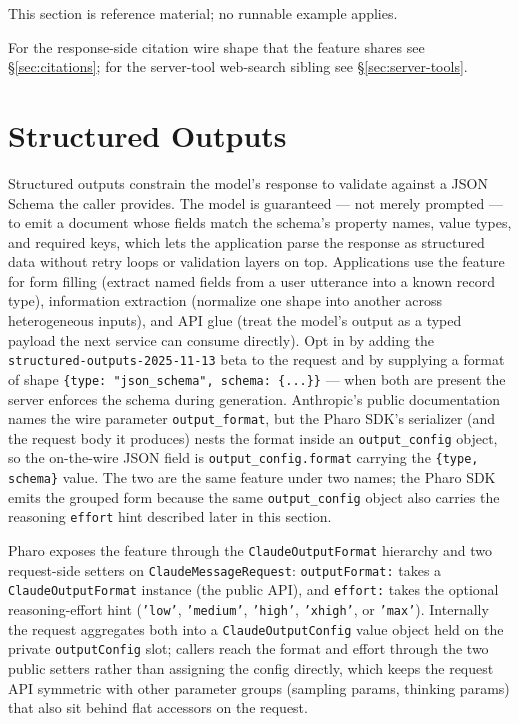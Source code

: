 \documentclass[a4paper,10pt,fleqn]{article}
\begin{document}
This section is reference material; no runnable example applies.

For the response-side citation wire shape that the feature shares
see §\ref{sec:citations}; for the server-tool web-search sibling
see §\ref{sec:server-tools}.

\medskip
\begin{sloppypar}
\end{sloppypar}

\section{Structured Outputs}
\label{sec:structured-outputs}

Structured outputs constrain the model's response to validate
against a JSON Schema the caller provides.  The model is guaranteed
--- not merely prompted --- to emit a document whose fields match
the schema's property names, value types, and required keys, which
lets the application parse the response as structured data without
retry loops or validation layers on top.  Applications use the
feature for form filling (extract named fields from a user
utterance into a known record type), information extraction
(normalize one shape into another across heterogeneous inputs),
and API glue (treat the model's output as a typed payload the
next service can consume directly).  Opt in by adding the
\texttt{structured-outputs-2025-11-13} beta to the request and
by supplying a format of shape
\texttt{\{type: "json\_schema", schema: \{...\}\}} --- when both
are present the server enforces the schema during generation.
Anthropic's public documentation names the wire parameter
\texttt{output\_format}, but the Pharo SDK's serializer (and the
request body it produces) nests the format inside an
\texttt{output\_config} object, so the on-the-wire JSON field is
\texttt{output\_config.format} carrying the
\texttt{\{type, schema\}} value.  The two are the same feature
under two names; the Pharo SDK emits the grouped form because the
same \texttt{output\_config} object also carries the reasoning
\texttt{effort} hint described later in this section.

\begin{sloppypar}
Pharo exposes the feature through the \texttt{ClaudeOutputFormat}
hierarchy and two request-side setters on \texttt{ClaudeMessageRequest}:
\texttt{outputFormat:} takes a \texttt{ClaudeOutputFormat} instance
(the public API), and \texttt{effort:} takes the optional
reasoning-effort hint (\texttt{'low'}, \texttt{'medium'},
\texttt{'high'}, \texttt{'xhigh'}, or \texttt{'max'}).  Internally
the request aggregates both into a \texttt{ClaudeOutputConfig}
value object held on the private \texttt{outputConfig} slot;
callers reach the format and effort through the two public setters
rather than assigning the config directly, which keeps the request
API symmetric with other parameter groups (sampling params,
thinking params) that also sit behind flat accessors on the
request.
\end{sloppypar}
\end{document}
